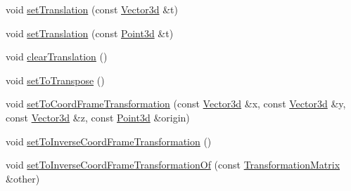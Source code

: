 \begin{DoxyCompactItemize}
\item 
void \hyperlink{classCartWheel_1_1Math_1_1TransformationMatrix_a0abcd5611957fc28fdd5b0051dffde9e}{setTranslation} (const \hyperlink{classCartWheel_1_1Math_1_1Vector3d}{Vector3d} \&t)
\item 
void \hyperlink{classCartWheel_1_1Math_1_1TransformationMatrix_a82063df8524e1a1dfb9fbee82d73cc97}{setTranslation} (const \hyperlink{classCartWheel_1_1Math_1_1Point3d}{Point3d} \&t)
\item 
void \hyperlink{classCartWheel_1_1Math_1_1TransformationMatrix_abbb6ded35e00d541ba4d00d278d6bbb1}{clearTranslation} ()
\item 
void \hyperlink{classCartWheel_1_1Math_1_1TransformationMatrix_a934946ab95fb6777ae21f5c26082d6bc}{setToTranspose} ()
\item 
void \hyperlink{classCartWheel_1_1Math_1_1TransformationMatrix_a4782fe58d012a498373bc7005fe04b11}{setToCoordFrameTransformation} (const \hyperlink{classCartWheel_1_1Math_1_1Vector3d}{Vector3d} \&x, const \hyperlink{classCartWheel_1_1Math_1_1Vector3d}{Vector3d} \&y, const \hyperlink{classCartWheel_1_1Math_1_1Vector3d}{Vector3d} \&z, const \hyperlink{classCartWheel_1_1Math_1_1Point3d}{Point3d} \&origin)
\item 
void \hyperlink{classCartWheel_1_1Math_1_1TransformationMatrix_a31e8038d6078dadafdf38211f42737aa}{setToInverseCoordFrameTransformation} ()
\item 
void \hyperlink{classCartWheel_1_1Math_1_1TransformationMatrix_a42020e7d7587084686f0cd5cc047cf90}{setToInverseCoordFrameTransformationOf} (const \hyperlink{classCartWheel_1_1Math_1_1TransformationMatrix}{TransformationMatrix} \&other)
\end{DoxyCompactItemize}


